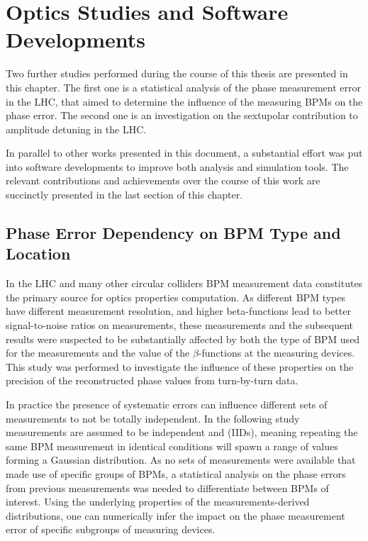 \chapter{Optics Studies and Software Developments}
\label{chapter:others_and_software}

Two further studies performed during the course of this thesis are presented in this chapter.
The first one is a statistical analysis of the phase measurement error in the \gls{LHC}, that aimed to determine the influence of the measuring \glspl{BPM} on the phase error.
The second one is an investigation on the sextupolar contribution to amplitude detuning in the LHC.

In parallel to other works presented in this document, a substantial effort was put into software developments to improve both analysis and simulation tools.
The relevant contributions and achievements over the course of this work are succinctly presented in the last section of this chapter.


\section{Phase Error Dependency on BPM Type and Location}
\label{section:phase_error_dependency_on_bpm_type_and_location}

In the \gls{LHC} and many other circular colliders \gls{BPM} measurement data constitutes the primary source for \gls{optics} properties computation.
As different BPM types~\cite{CERN:Equipment_Codes} have different measurement resolution, and higher \glspl{beta-function} lead to better signal-to-noise ratios on measurements, these measurements and the subsequent results were suspected to be substantially affected by both the type of BPM used for the measurements and the value of the \(\beta\)-functions at the measuring devices.
This study was performed to investigate the influence of these properties on the precision of the reconstructed phase values from turn-by-turn data.

In practice the presence of systematic errors can influence different sets of measurements to not be totally independent.
In the following study measurements are assumed to be independent and  (IIDs), meaning repeating the same BPM measurement in identical conditions will spawn a range of values forming a Gaussian distribution.
As no sets of measurements were available that made use of specific groups of BPMs, a statistical analysis on the phase errors from previous measurements was needed to differentiate between BPMs of interest. 
Using the underlying properties of the measurements-derived distributions, one can numerically infer the impact on the phase measurement error of specific subgroups of measuring devices.

